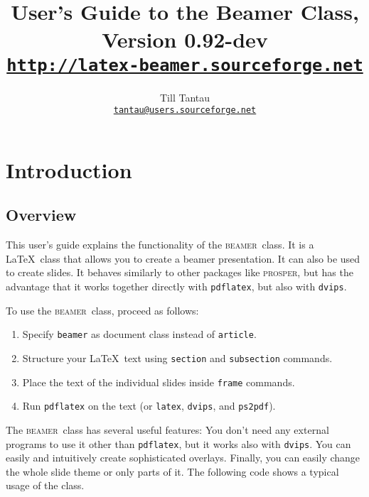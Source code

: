 \documentclass{article}
\def\beamer{\textsc{beamer}}
\begin{document}
\title{User's Guide to the Beamer Class, Version 0.92-dev\\
\Large\href{http://latex-beamer.sourceforge.net}{\texttt{http://latex-beamer.sourceforge.net}}}
\author{Till Tantau\\
  \href{mailto:tantau@users.sourceforge.net}{\texttt{tantau@users.sourceforge.net}}}

\maketitle

\tableofcontents



\section{Introduction}


\subsection{Overview}

This user's guide explains the functionality of the \beamer\ class.
It is a \LaTeX\ class that allows you to create a beamer
presentation. It can also be used to create slides. It behaves
similarly to other packages like \textsc{prosper}, but has the
advantage that it works together directly with \texttt{pdflatex}, but
also with \texttt{dvips}.

To use the \beamer\ class, proceed as follows:
\begin{enumerate}
\item
  Specify \texttt{beamer} as document class instead of
  \texttt{article}.
\item
  Structure your \LaTeX\ text using \texttt{section} and
  \texttt{subsection} commands.
\item
  Place the text of the individual slides inside \texttt{frame}
  commands.
\item
  Run \texttt{pdflatex} on the text (or \texttt{latex},
  \texttt{dvips}, and \texttt{ps2pdf}).
\end{enumerate}

The \beamer\ class has several useful features: You don't need any
external programs to use it other than \texttt{pdflatex}, but it works
also with \texttt{dvips}. You can easily and intuitively create
sophisticated overlays. Finally, you can easily change the whole slide
theme or only parts of it. The following code shows a typical usage of
the class.
\end{document}
